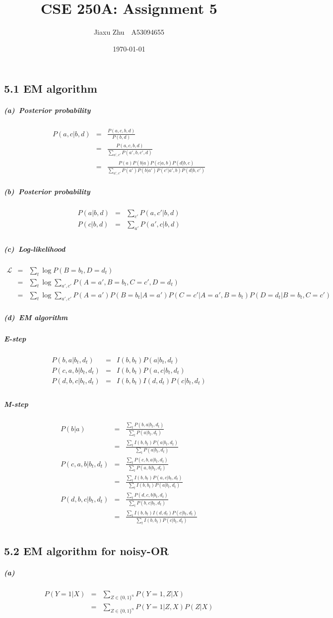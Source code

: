 \documentclass{article}
\begin{document}
\title{CSE 250A: Assignment 5}
\author{Jiaxu Zhu~~A53094655}
\date{\today}
\maketitle
\subsection*{5.1 EM algorithm}
\subparagraph*{(a)~Posterior probability}
\begin{eqnarray*}
	P(a,c|b,d) &=& \frac{P(a,c,b,d)}{P(b,d)}\\
	&=&\frac{P(a,c,b,d)}{\sum_{a',c'}P(a',b,c',d)}\\
	&=&\frac{P(a)P(b|a)P(c|a,b)P(d|b,c)}{\sum_{a',c'}P(a')P(b|a')P(c'|a',b)P(d|b,c')}
\end{eqnarray*}

\subparagraph*{(b)~Posterior probability}
\begin{eqnarray*}
	P(a|b,d) &=& \sum_{c'}P(a,c'|b,d)\\
	P(c|b,d) &=& \sum_{a'}P(a',c|b,d)\\ 
\end{eqnarray*}

\subparagraph*{(c)~Log-likelihood}
\begin{eqnarray*}
	\mathcal{L} &=& \sum_{t}\log P(B = b_t, D = d_t)\\
	&=& \sum_{t}\log \sum_{a', c'}P(A = a', B = b_t, C = c', D = d_t)\\
	&=& \sum_{t}\log \sum_{a',c'}P(A=a')P(B=b_t|A=a')P(C=c'|A=a',B=b_t)P(D=d_t|B=b_t,C=c')
\end{eqnarray*}

\subparagraph*{(d)~EM algorithm}
\subparagraph*{E-step}
\begin{eqnarray*}
	P(b,a|b_t, d_t) &=& I(b, b_t)P(a|b_t, d_t)\\
	P(c, a, b | b_t, d_t) &=& I(b, b_t)P(a, c|b_t, d_t)\\
	P(d, b, c | b_t, d_t) &=& I(b, b_t)I(d, d_t)P(c|b_t, d_t)\\
\end{eqnarray*}
\subparagraph*{M-step}
\begin{eqnarray*}
	P(b | a) &=& \frac{\sum_{t}P(b, a|b_t, d_t)}{\sum_{t}P(a|b_t, d_t)}\\
	&=& \frac{\sum_{t}I(b, b_t)P(a|b_t, d_t)}{\sum_{t}P(a|b_t, d_t)}\\
	P(c, a, b | b_t, d_t) &=& \frac{\sum_{t}P(c, b, a|b_t, d_t)}{\sum_{t}P(a, b|b_t, d_t)}\\
	&=& \frac{\sum_{t}I(b, b_t)P(a, c|b_t, d_t)}{\sum_{t}I(b, b_t)P(a|b_t, d_t)}\\
	P(d, b, c | b_t, d_t) &=& \frac{\sum_{t}P(d, c, b|b_t, d_t)}{\sum_{t}P(b, c|b_t, d_t)}\\
	&=& \frac{\sum_{t}I(b, b_t)I(d, d_t)P(c|b_t, d_t)}{\sum_{t}I(b, b_t)P(c|b_t, d_t)}\\
\end{eqnarray*}

\subsection*{5.2 EM algorithm for noisy-OR}
\subparagraph*{(a)}
\begin{eqnarray*}
	P(Y = 1| X) &=& \sum_{Z \in \{0,1\}^n}P(Y =1 ,Z | X)\\	
	&=& \sum_{Z \in \{0,1\}^n}P(Y =1 |Z , X)P(Z|X)
\end{eqnarray*}
\end{document}
